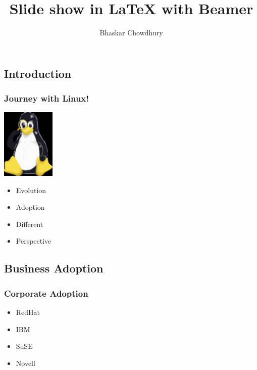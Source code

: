 \documentclass{beamer}
\title{Slide show in {\LaTeX} with Beamer}
\author{Bhaskar Chowdhury}
\begin{document}
\maketitle


\begin{frame}


	\section{Introduction}

\frametitle{Journey with Linux!}

\includegraphics[width=1in]{cover_small.jpg}
\begin{itemize}
		\item Evolution
		\item Adoption
		\item Different
		\item Perspective
	\end{itemize}			
\end{frame}

\begin{frame}



	\section{Business Adoption}	

\frametitle{Corporate Adoption}

\begin{itemize}
		\item RedHat
		\item IBM
		\item SuSE
		\item Novell
	\end{itemize}			
\end{frame}
\end{document}
